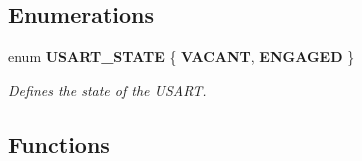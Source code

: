 \subsection*{Enumerations}
\begin{DoxyCompactItemize}
\item 
enum {\bf U\+S\+A\+R\+T\+\_\+\+S\+T\+A\+T\+E} \{ {\bf V\+A\+C\+A\+N\+T}, 
{\bf E\+N\+G\+A\+G\+E\+D}
 \}
\begin{DoxyCompactList}\small\item\em Defines the state of the U\+S\+A\+R\+T. \end{DoxyCompactList}\end{DoxyCompactItemize}
\subsection*{Functions}
